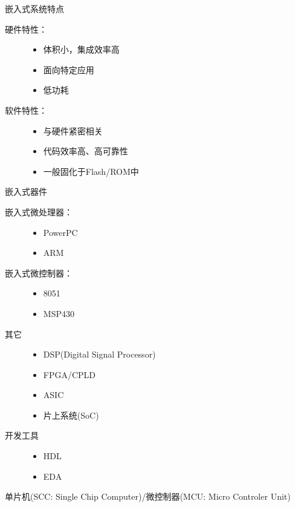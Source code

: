 \begin{frame}{嵌入式系统特点}
\begin{description}
\item [硬件特性：]
\begin{itemize}
\item 体积小，集成效率高
\item 面向特定应用
\item 低功耗
\end{itemize}
\item[软件特性：]
\begin{itemize}
\item 与硬件紧密相关
\item 代码效率高、高可靠性
\item 一般固化于Flash/ROM中
\end{itemize}
\end{description}
\end{frame}

\begin{frame}{嵌入式器件}
\begin{description}
\item [嵌入式微处理器：]
\begin{itemize}
\item PowerPC
\item ARM
\end{itemize}
\item[嵌入式微控制器：]
\begin{itemize}
\item 8051
\item MSP430
\end{itemize}
\item[其它]
\begin{itemize}
\item DSP(Digital Signal Processor)
\item FPGA/CPLD
\item ASIC
\item 片上系统(SoC)
\end{itemize}
\item[开发工具]
\begin{itemize}
\item HDL
\item EDA
\end{itemize}
\end{description}
\end{frame}

\begin{frame}{单片机(SCC: Single Chip Computer)/微控制器(MCU: Micro Controler Unit)}
\begin{center}\end{center}
\end{frame}

